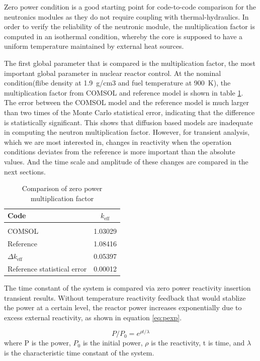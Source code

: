 \documentclass{elsarticle}
\newcommand{\keff}{{\ensuremath{k_{\mathrm{eff}}}} }
\begin{document}
Zero power condition is a good starting point for code-to-code comparison for the neutronics modules as they do not require coupling with thermal-hydraulics. In order to verify the reliability of the neutronic module, the multiplication factor is computed in an isothermal condition, whereby the core is supposed to have a uniform temperature maintained by external heat sources.
 
The first global parameter that is compared is the multiplication factor, the most important global parameter in nuclear reactor control. 
At the nominal condition(flibe density at 1.9~g/cm3 and fuel temperature at 900~K), the multiplication factor from COMSOL and reference model is shown in table \ref{tab:keff}. The error between the COMSOL model and the reference model is much larger than two times of the Monte Carlo statistical error, indicating that the difference is statistically significant. This shows that diffusion based models are inadequate in computing the neutron multiplication factor. However, for transient analysis, which we are most interested in, changes in reactivity when the operation conditions deviates from the reference is more important than the absolute values.
And the time scale and amplitude of these changes are compared in the next sections.

\begin{table}
\centering
  \begin{tabular}{lc}
  \hline
        Code & \keff \\
        \hline\\
       COMSOL & 1.03029  \\
       Reference & 1.08416\\
       $\Delta$\keff & 0.05397\\
       Reference statistical error & 0.00012\\
       \hline
  \end{tabular}
  \caption{Comparison of zero power multiplication factor}
  \label{tab:keff}
\end{table}

The time constant of the system is compared via zero power reactivity insertion transient results. Without temperature reactivity feedback that would stablize the power at a certain level, the reactor power increases exponentially due to excess external reactivity, as shown in equation \ref{eq:pexp}. 

\begin{equation}
P/P_0 =  e^{\rho t/\lambda}
\label{eq:pexp}
\end{equation}
where P is the power, $P_0$ is the initial power, $\rho$ is the reactivity, t is time, and $\lambda$ is the characteristic time constant of the system. 
\end{document}
